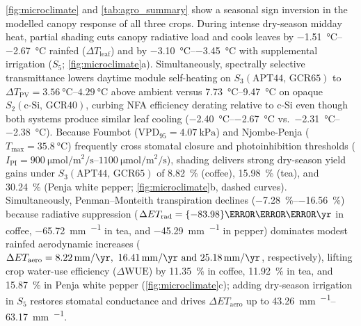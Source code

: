\documentclass[preprint,12pt,a4paper]{elsarticle}
\begin{document}
\cref{fig:microclimate} and \cref{tab:agro_summary} show a seasonal sign inversion in the modelled canopy response of all three crops. During intense dry-season midday heat, partial shading cuts canopy radiative load and cools leaves by \qtyrange{-1.51}{-2.67}{\celsius} rainfed ($\Delta T_{\mathrm{leaf}}$) and by \qtyrange{-3.10}{-3.45}{\celsius} with supplemental irrigation ($S_5$; \cref{fig:microclimate}a). Simultaneously, spectrally selective transmittance lowers daytime module self-heating on $S_3(\mathrm{APT44,\,GCR65})$ to $\Delta T_{\mathrm{PV}} = \qtyrange{3.56}{4.29}{\celsius}$ above ambient versus \qtyrange{7.73}{9.47}{\celsius} on opaque $S_2(\mathrm{c\text{-}Si,\,GCR40})$, curbing NFA efficiency derating relative to c-Si even though both systems produce similar leaf cooling (\qtyrange{-2.40}{-2.67}{\celsius} vs.\ \qtyrange{-2.31}{-2.38}{\celsius}). Because Foumbot ($\mathrm{VPD}_{95} = \qty{4.07}{\kilo\pascal}$) and Njombe-Penja ($T_{\max} = \qty{35.8}{\celsius}$) frequently cross stomatal closure and photoinhibition thresholds ($I_{\mathrm{PI}}=\qtyrange{900}{1100}{\micro\mole\per\square\meter\per\second}$), shading delivers strong dry-season yield gains under $S_3(\mathrm{APT44,\,GCR65})$ of \qty{+8.82}{\percent} (coffee), \qty{+15.98}{\percent} (tea), and \qty{+30.24}{\percent} (Penja white pepper; \cref{fig:microclimate}b, dashed curves). Simultaneously, Penman--Monteith transpiration declines (\qtyrange{-7.28}{-16.56}{\percent}) because radiative suppression ($\Delta ET_{\mathrm{rad}} = \qty{-83.98}{\milli\meter\per\yr}$ in coffee, \qty{-65.72}{\milli\meter\per\yr} in tea, and \qty{-45.29}{\milli\meter\per\yr} in pepper) dominates modest rainfed aerodynamic increases ($\Delta ET_{\mathrm{aero}} = \qtylist{+8.22;+16.41;+25.18}{\milli\meter\per\yr}$, respectively), lifting crop water-use efficiency ($\Delta\mathrm{WUE}$) by \qty{+11.35}{\percent} in coffee, \qty{+11.92}{\percent} in tea, and \qty{+15.87}{\percent} in Penja white pepper (\cref{fig:microclimate}c); adding dry-season irrigation in $S_5$ restores stomatal conductance and drives $\Delta ET_{\mathrm{aero}}$ up to \qtyrange{+43.26}{+63.17}{\milli\meter\per\yr}.
\end{document}
